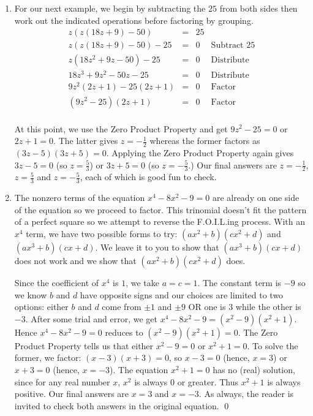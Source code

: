 \documentclass{ximera}
\begin{document}
\begin{example}
\begin{explanation}
\begin{enumerate}
\item  For our next example, we begin by subtracting the $25$ from both sides then work out the indicated operations before factoring by grouping.\[ \begin{array}{rclr}

z(z(18z+9)-50) & = & 25 & \\

z(z(18z+9)-50) - 25 & = & 0 & \text{Subtract $25$} \\
z(18z^2 + 9z - 50) - 25 & = & 0 & \text{Distribute} \\
18z^3 + 9z^2 - 50z - 25 & = & 0 & \text{Distribute} \\

9z^2(2z + 1) - 25(2z + 1) & = & 0 & \text{Factor} \\

(9z^2 - 25)(2z+1) & = & 0 & \text{Factor} \\ \end{array} \]

At this point, we use the Zero Product Property and get $9z^2 - 25 = 0$ or $2z + 1 = 0$.  The latter gives $z = -\frac{1}{2}$ whereas the former  factors as $(3z - 5)(3z+5) = 0$.  Applying the Zero Product Property again gives $3z-5 = 0$ (so $z = \frac{5}{3}$) or $3z+5 = 0$ (so $z = -\frac{5}{3}$.) Our final answers are $z = -\frac{1}{2}$,  $z = \frac{5}{3}$ and $z = -\frac{5}{3}$, each of which is good fun to check.

\item  The nonzero terms of the equation $x^4-8x^2 - 9= 0$ are already on one side of the equation so we proceed to factor.  This trinomial doesn't fit the pattern of a perfect square so we attempt to reverse the F.O.I.L.ing process.  With an $x^4$ term, we have two possible forms to try:  $(ax^2 + b)(cx^2 + d)$ and $(ax^3 + b)(cx +d)$.  We leave it to you to show that $(ax^3 + b)(cx +d)$ does not work and we show that  $(ax^2 + b)(cx^2 + d)$ does. 

 

Since the coefficient of $x^4$ is $1$, we take $a = c = 1$.  The constant term is $-9$ so we know $b$ and $d$ have opposite signs and our choices are limited to two options: either $b$ and $d$ come from $\pm 1$ and $\pm 9$ OR one is $3$ while the other is $-3$.  After some trial and error, we get $x^4 - 8x^2 - 9 = (x^2 - 9)(x^2+1)$.  Hence $x^4-8x^2 - 9= 0$ reduces to $(x^2 - 9)(x^2 + 1) = 0$.  The Zero Product Property tells us that either $x^2 - 9 = 0$ or $x^2+1 = 0$.  To solve the former, we factor: $(x-3)(x+3) = 0$, so $x-3 = 0$ (hence, $x = 3$) or $x+3 = 0$ (hence, $x = -3$).  The equation $x^2 + 1 = 0$ has no (real) solution, since for any real number $x$, $x^2$ is always $0$ or greater.  Thus $x^2 + 1$ is always positive.  Our final answers are $x = 3$ and $x = -3$. As always, the reader is invited to check both answers in the original equation. \qed

\end{enumerate}
\end{explanation}
\end{example}



\closegraphsfile
\end{document}
